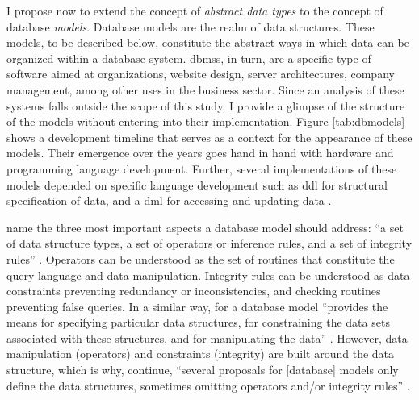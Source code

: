 I propose now to extend the concept of \textit{abstract data types} to the concept of database \textit{models}. Database models are the realm of data structures. These models, to be described below, constitute the abstract ways in which data can be organized within a database system. \gls{dbms}s, in turn, are a specific type of software aimed at organizations, website design, server architectures, company management, among other uses in the business sector. Since an analysis of these systems falls outside the scope of this study, I provide a glimpse of the structure of the models without entering into their implementation. Figure \ref{tab:dbmodels} shows a development timeline that serves as a context for the appearance of these models. Their emergence over the years goes hand in hand with hardware and programming language development. Further, several implementations of these models depended on specific language development such as \gls{ddl} for structural specification of data, and a \gls{dml} for accessing and updating data \parencite[4]{DBLP:books/aw/AbiteboulHV95}. 

\textcite{2008:graph/anglesgutierrez/survey} name the three most important aspects a database model should address: ``a set of data structure types, a set of operators or inference rules, and a set of integrity rules'' \parencite[2]{2008:graph/anglesgutierrez/survey}. Operators can be understood as the set of routines that constitute the query language and data manipulation. Integrity rules can be understood as data constraints preventing redundancy or inconsistencies, and checking routines preventing false queries. In a similar way, for \textcite{DBLP:books/aw/AbiteboulHV95} a database model ``provides the means for specifying particular data structures, for constraining the data sets associated with these structures, and for manipulating the data'' \parencite[28]{DBLP:books/aw/AbiteboulHV95}. However, data manipulation (operators) and constraints (integrity) are built around the data structure, which is why, \textcite{2008:graph/anglesgutierrez/survey} continue, ``several proposals for [database] models only define the data structures, sometimes omitting operators and/or integrity rules'' \parencite[2]{2008:graph/anglesgutierrez/survey}. 

